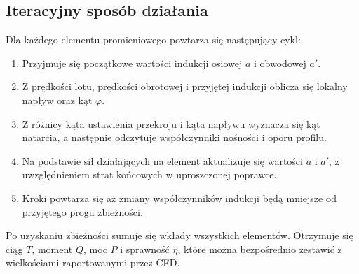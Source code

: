 \documentclass[12pt,a4paper,twoside]{article}
\begin{document}
	\subsection{Iteracyjny sposób działania}
	Dla każdego elementu promieniowego powtarza się następujący cykl:
	\begin{enumerate}[label=\arabic*.]
		\item Przyjmuje się początkowe wartości indukcji osiowej \(a\) i obwodowej \(a'\).
		\item Z prędkości lotu, prędkości obrotowej i przyjętej indukcji oblicza się lokalny napływ oraz kąt \(\varphi\).
		\item Z różnicy kąta ustawienia przekroju i kąta napływu wyznacza się kąt natarcia, a następnie odczytuje współczynniki nośności i oporu profilu.
		\item Na podstawie sił działających na element aktualizuje się wartości \(a\) i \(a'\), z uwzględnieniem strat końcowych w uproszczonej poprawce.
		\item Kroki powtarza się aż zmiany współczynników indukcji będą mniejsze od przyjętego progu zbieżności.
	\end{enumerate}
	Po uzyskaniu zbieżności sumuje się wkłady wszystkich elementów. Otrzymuje się ciąg \(T\), moment \(Q\), moc \(P\) i sprawność \(\eta\), które można bezpośrednio zestawić z wielkościami raportowanymi przez CFD.
\end{document}
